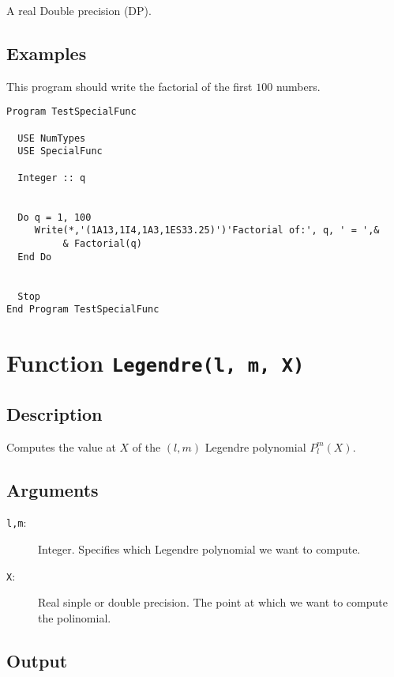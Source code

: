 A real Double precision (DP).

\subsection{Examples}

This program should write the factorial of the first $100$ numbers.

\begin{lstlisting}[emph=Factorial,
                   emphstyle=\color{blue},
                   frame=trBL,
                   caption=Computing the factorial.,
                   label=gammaln]
Program TestSpecialFunc

  USE NumTypes
  USE SpecialFunc

  Integer :: q


  Do q = 1, 100
     Write(*,'(1A13,1I4,1A3,1ES33.25)')'Factorial of:', q, ' = ',&
          & Factorial(q)
  End Do


  Stop
End Program TestSpecialFunc
\end{lstlisting}

\section{Function \texttt{Legendre(l, m, X)}}

\subsection{Description}

Computes the value at $X$ of the $(l,m)$ Legendre polynomial $P_l^m(X)$.

\subsection{Arguments}

\begin{description}
\item[\texttt{l,m}:] Integer. Specifies which Legendre polynomial we
  want to compute.
\item[\texttt{X}:] Real sinple or double precision. The point at which
  we want to compute the polinomial.
\end{description}

\subsection{Output}

